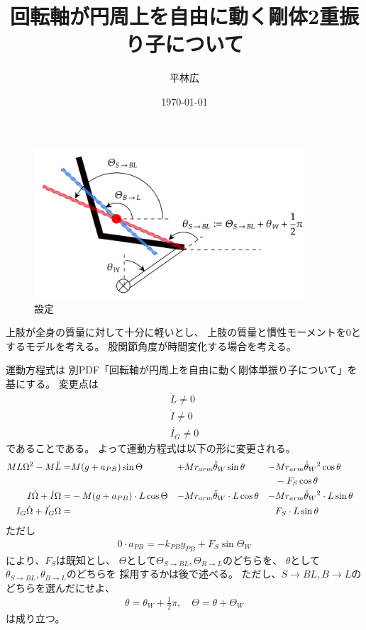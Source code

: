 \documentclass[a4paper,11pt]{jsarticle}
\begin{document}
\title{回転軸が円周上を自由に動く剛体2重振り子について}
\author{平林広}
\date{\today}
\maketitle

\begin{figure}[h]
  \centering
  \includegraphics[width = 0.9\textwidth]{conf.png}
  \caption{設定}
  \label{conf.png}
\end{figure}
上肢が全身の質量に対して十分に軽いとし、
上肢の質量と慣性モーメントを$0$とするモデルを考える。
股関節角度が時間変化する場合を考える。

運動方程式は
別PDF「回転軸が円周上を自由に動く剛体単振り子について」を基にする。
変更点は
\begin{gather*}
  \ddot{L} \neq 0
  \\
  \dot{I} \neq 0
  \\
  \dot{I_G} \neq 0
\end{gather*}
であることである。
よって運動方程式は以下の形に変更される。
\begin{align}
  ML\Omega^2 - M\ddot{L}
  =& M(g+a_{PB})\sin\Theta 
  &+& Mr_{arm}\ddot{\theta}_W\sin\theta 
  &-& Mr_{arm}\dot{\theta}_W{}^2\cos\theta 
  \notag
  \\
  &&&&&- F_S\cos\theta
  \label{eq:PB:L_start}
  \\
  I\dot\Omega + \dot{I}\Omega
  =& -M(g+a_{PB}) \cdot L\cos\Theta
  &-& Mr_{arm}\ddot{\theta}_W \cdot L \cos\theta
  &-& Mr_{arm}\dot{\theta}_W{}^2 \cdot L \sin\theta
  &
  \label{eq:PB:I_start}
  \\
  I_G\dot\Omega + \dot{I_G}\Omega
  =& 
  &&&& F_S \cdot L \sin\theta
  \label{eq:PB:IG_start}
\end{align}
ただし
\begin{gather*}
  0\cdot a_{PB} = -k_{PB}y_{PB} + F_S\sin\Theta_W
\end{gather*}
により、$F_S$は既知とし、
$\Theta$として$\Theta_{S\rightarrow BL}, \Theta_{B\rightarrow L}$のどちらを、
$\theta$として$\theta_{S\rightarrow BL}, \theta_{B\rightarrow L}$のどちらを
採用するかは後で述べる。
ただし、$S\rightarrow BL, B\rightarrow L$のどちらを選んだにせよ、
\begin{gather*}
  \theta = \theta_W + \frac{1}{2}\pi,\quad \Theta = \theta + \Theta_W
\end{gather*}
は成り立つ。
\end{document}
